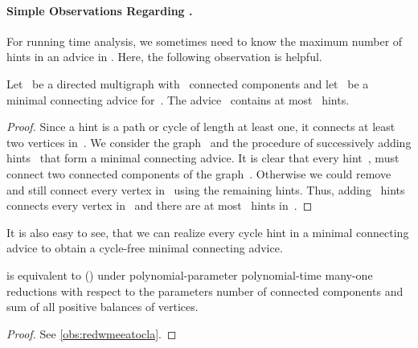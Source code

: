 \paragraph{Simple Observations Regarding \pWMEECAs{}.}
For running time analysis, we sometimes need to know the maximum number of hints in an advice in \pWMEECAs{}. Here, the following observation is helpful.
\begin{observation} \label{obs:hintsinadvice}
  Let~ be a directed multigraph with~ connected components and let~ be a minimal connecting advice for~. The advice~ contains at most~ hints.
\end{observation}
\begin{proof}
  Since a hint is a path or cycle of length at least one, it connects at least two vertices in~. We consider the graph~ and the procedure of successively adding hints~ that form a minimal connecting advice. It is clear that every hint~, must connect two connected components of the graph~. Otherwise we could remove~ and still connect every vertex in~ using the remaining hints. Thus, adding~ hints connects every vertex in~ and there are at most~ hints in~.
\end{proof}
It is also easy to see, that we can realize every cycle hint in a minimal connecting advice to obtain a cycle-free minimal connecting advice.
\begin{observation}\label{obs:redwmeecatoccla}
  \pWMEECA{} is equivalent to \pWMEECCLA{} (\pWMEECCLAs{}) under polynomial-parameter polynomial-time many-one reductions with respect to the parameters number of connected components and sum of all positive balances of vertices.
\end{observation}
\begin{proof}
  See \autoref{obs:redwmeeatocla}.
\end{proof}




